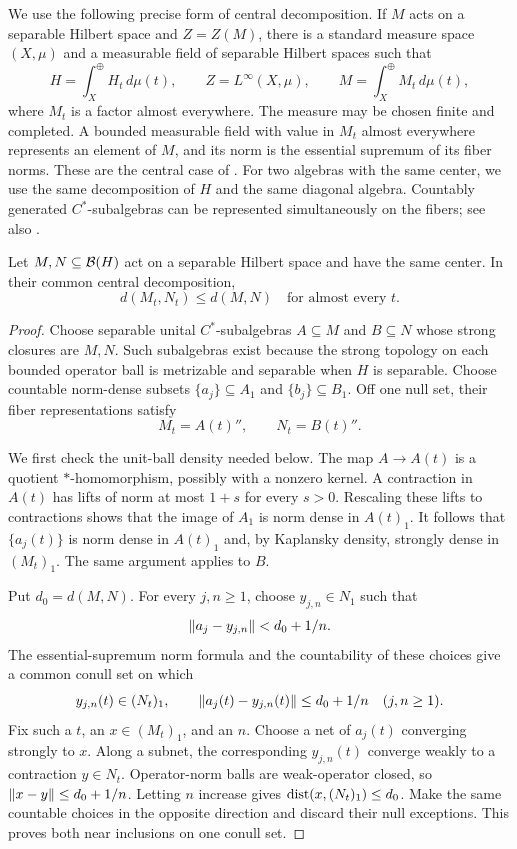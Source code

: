 We use the following precise form of central decomposition.  If $M$
acts on a separable Hilbert space and $Z=Z(M)$, there is a standard
measure space $(X,\mu)$ and a measurable field of separable Hilbert
spaces such that
\[
 H=\int_X^\oplus H_t\,d\mu(t),\qquad
 Z=L^\infty(X,\mu),\qquad
 M=\int_X^\oplus M_t\,d\mu(t),
\]
where $M_t$ is a factor almost everywhere.  The measure may be chosen
finite and completed.  A bounded measurable field with value in $M_t$
almost everywhere represents an element of $M$, and its norm is the
essential supremum of its fiber norms.  These are the central case of
\cite[III.1.6.2--4]{BlackadarOperatorAlgebras}.  For two algebras with
the same center, we use the same decomposition of $H$ and the same
diagonal algebra.  Countably generated $C^*$-subalgebras can be
represented simultaneously on the fibers;
see also \cite[III.5.1.10--14]{BlackadarOperatorAlgebras}.

\begin{lemma}\label{lem:fiber-gap}
Let $M,N\subseteq\mathcal B(H)$ act on a separable Hilbert space and have the
same center.  In their common central decomposition,
\[
 d(M_t,N_t)\leq d(M,N)
 \quad\text{for almost every }t.
\]
\end{lemma}

\begin{proof}
Choose separable unital $C^*$-subalgebras $A\subseteq M$ and
$B\subseteq N$ whose strong closures are $M,N$.  Such subalgebras
exist because the strong topology on each bounded operator ball is
metrizable and separable when $H$ is separable.  Choose countable
norm-dense subsets $\{a_j\}\subseteq A_1$ and
$\{b_j\}\subseteq B_1$.  Off one null set, their fiber representations
satisfy
\[
 M_t=A(t)'',\qquad N_t=B(t)''.
\]

We first check the unit-ball density needed below.  The map
$A\to A(t)$ is a quotient $*$-homomorphism, possibly with a nonzero
kernel.  A contraction in $A(t)$ has lifts of norm at most $1+s$ for
every $s>0$.  Rescaling these lifts to contractions shows that the
image of $A_1$ is norm dense in $A(t)_1$.  It follows that
$\{a_j(t)\}$ is norm dense in $A(t)_1$ and, by Kaplansky density,
strongly dense in $(M_t)_1$.  The same argument applies to $B$.

Put $d_0=d(M,N)$.  For every $j,n\geq1$, choose
$y_{j,n}\in N_1$ such that
\[
 \lVert a_j-y_{j,n}\rVert<d_0+1/n.
\]
The essential-supremum norm formula and the countability of these
choices give a common conull set on which
\[
 y_{j,n}(t)\in(N_t)_1,
 \qquad
 \lVert a_j(t)-y_{j,n}(t)\rVert\leq d_0+1/n
 \quad(j,n\geq1).
\]
Fix such a $t$, an $x\in(M_t)_1$, and an $n$.  Choose a net of
$a_j(t)$ converging strongly to $x$.  Along a subnet, the corresponding
$y_{j,n}(t)$ converge weakly to a contraction $y\in N_t$.
Operator-norm balls are weak-operator closed, so
$\lVert x-y\rVert\leq d_0+1/n$.  Letting $n$ increase gives
$\operatorname{dist}(x,(N_t)_1)\leq d_0$.  Make the same countable choices in the
opposite direction and discard their null exceptions.  This proves
both near inclusions on one conull set.
\end{proof}

